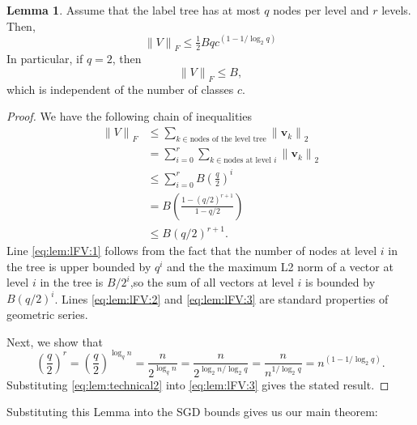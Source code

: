 \documentclass[10pt]{article}
\theoremstyle{definition}
\newtheorem{lemma}{Lemma}
\newcommand{\vv}{\mathbf v}
\newcommand{\ltwo}[1]{{\lVert {#1} \rVert}_2}
\newcommand{\lF}[1]{{\lVert {#1} \rVert}_F}
\begin{document}
\begin{lemma}
    Assume that the label tree has at most $q$ nodes per level and $r$ levels.
    Then,
    \begin{equation}
        \lF{V} \le \tfrac12 Bq c^{(1 - 1/\log_2 q)}
    \end{equation}
    In particular, if $q=2$, then
    \begin{equation}
        \lF{V} \le B,
    \end{equation}
    which is independent of the number of classes $c$.
\end{lemma}
\begin{proof}
    We have the following chain of inequalities
    \begin{align}
        \lF{V} 
        &\le \sum_{k\in \text{nodes of the level tree}} \ltwo{\vv_k}
        \\
        &= \sum_{i=0}^r \sum_{k\in \text{nodes at level $i$}} \ltwo{\vv_k}
        \\
        &\le \sum_{i=0}^r B\left(\frac {q} {2}\right)^i
        \label{eq:lem:lFV:1}
        \\
        &=
        B\left(\frac{1 - (q/2)^{r+1}}{1-q/2}\right)
        \label{eq:lem:lFV:2}
        \\
        &\le
        B(q/2)^{r+1}.
        \label{eq:lem:lFV:3}
    \end{align}
    Line \eqref{eq:lem:lFV:1} follows from the fact that the number of nodes at level $i$ in the tree is upper bounded by $q^i$ and the the maximum L2 norm of a vector at level $i$ in the tree is $B/2^i$,so the sum of all vectors at level $i$ is bounded by $B(q/2)^i$.
    Lines \eqref{eq:lem:lFV:2} and \eqref{eq:lem:lFV:3} are standard properties of geometric series.

    Next, we show that
    \begin{equation}
        \left(\frac q 2\right)^r
        =
        \left(\frac q 2\right)^{\log_q n}
        =
        \frac{n}{2^{\log_q n}}
        =
        \frac{n}{2^{{\log_2 n}/{\log_2 q}}}
        =
        \frac{n}{n^{1/\log_2 q}}
        =
        n^{\left(1 - {1}/{\log_2 q}\right)}
        .
        \label{eq:lem:technical2}
    \end{equation}
    Substituting \eqref{eq:lem:technical2} into \eqref{eq:lem:lFV:3} gives the stated result.
\end{proof}

Substituting this Lemma into the SGD bounds gives us our main theorem: 
\end{document}

